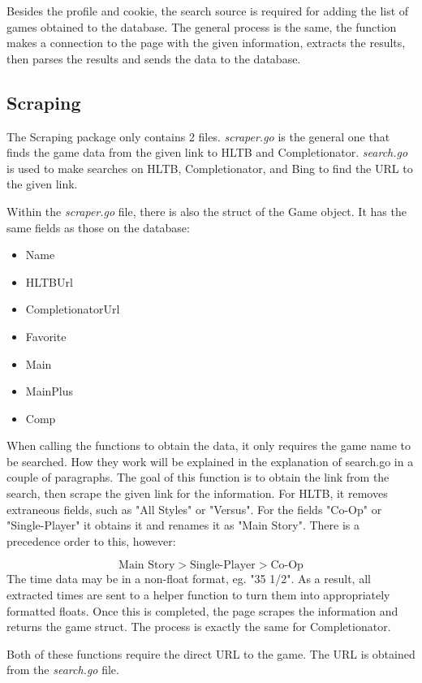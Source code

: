 Besides the profile and cookie, the search source is required for
adding the list of games obtained to the database.
The general process is the same, the function makes a connection to
the page with the given information, extracts the results, then
parses the results and sends the data to the database.

\subsection{Scraping}
\label{subsec:Scraping}

The Scraping package only contains 2 files. \textit{scraper.go} is
the general one that finds the game data from the given link to HLTB
and Completionator. \textit{search.go} is used to make searches on
HLTB, Completionator, and Bing to find the URL to the given link.

Within the \textit{scraper.go} file, there is also the struct of the
Game object.
It has the same fields as those on the database:
\begin{itemize}
	\item Name
	\item HLTBUrl
	\item CompletionatorUrl
	\item Favorite
	\item Main
	\item MainPlus
	\item Comp
\end{itemize}

When calling the functions to obtain the data, it only requires the
game name to be searched.
How they work will be explained in the explanation of search.go in a
couple of paragraphs.
The goal of this function is to obtain the link from the search, then
scrape the given link for the information.
For HLTB, it removes extraneous fields, such as "All Styles" or
"Versus". For the fields "Co-Op" or "Single-Player" it obtains it and
renames it as "Main Story".
There is a precedence order to this, however:

\[
	\text{Main Story} > \text{Single-Player} > \text{Co-Op}
\]
The time data may be in a non-float format, eg. "35 1/2".
As a result, all extracted times are sent to a helper function to
turn them into appropriately formatted floats.
Once this is completed, the page scrapes the information and returns
the game struct. The process is exactly the same for Completionator.

Both of these functions require the direct URL to the game.
The URL is obtained from the \textit{search.go} file.

